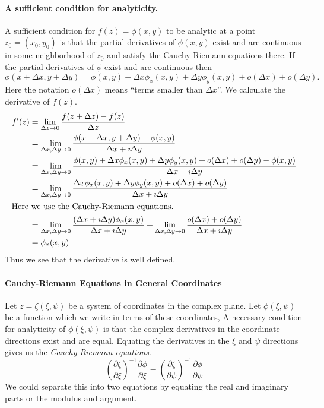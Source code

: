 \paragraph{A sufficient condition for analyticity.}
A sufficient condition for $f(z) = \phi(x,y)$ to be analytic at a point
$z_0 = \left( x_0,y_0 \right)$  is that the partial derivatives 
of $\phi(x,y)$ exist and 
are continuous in some neighborhood of $z_0$ and satisfy the 
Cauchy-Riemann equations there.
If the partial derivatives of $\phi$ exist and are continuous then
\[
\phi(x+\Delta x, y+\Delta y) = \phi(x,y) + \Delta x \phi_x(x,y) + \Delta y \phi_y(x,y)
+ o(\Delta x) + o(\Delta y).
\]
Here the notation $o(\Delta x)$ means ``terms smaller than $\Delta x$''.
We calculate the derivative of $f(z)$.
\begin{align*}
  f'(z)   &= \lim_{\Delta z \to 0} \frac{f(z+\Delta z)-f(z)}{\Delta z} \\
  &= \lim_{\Delta x, \Delta y \to 0} \frac{ \phi(x+\Delta x,y+\Delta y) - \phi(x,y) }
  {\Delta x + \imath \Delta y} 
  \\
  &= \lim_{\Delta x, \Delta y \to 0} \frac{ \phi(x,y) + \Delta x \phi_x(x,y) + 
    \Delta y \phi_y(x,y) + o(\Delta x) + o(\Delta y) 
    - \phi(x,y) }{ \Delta x + \imath \Delta y } 
  \\
  &= \lim_{\Delta x, \Delta y \to 0} \frac{ \Delta x \phi_x(x,y) + 
    \Delta y \phi_y(x,y) + o(\Delta x) + o(\Delta y) }
  {\Delta x + \imath \Delta y}
  \\
  \intertext{Here we use the Cauchy-Riemann equations.}
  &= \lim_{\Delta x, \Delta y \to 0} \frac{ (\Delta x + \imath \Delta y) \phi_x(x,y) }{\Delta x + \imath \Delta y} 
  + \lim_{\Delta x, \Delta y \to 0} \frac{ o(\Delta x) + o(\Delta y) } {\Delta x + \imath \Delta y}
  \\
  &= \phi_x(x,y)
\end{align*}
Thus we see that the derivative is well defined.









\paragraph{Cauchy-Riemann Equations in General Coordinates}
Let $z = \zeta(\xi, \psi)$ be a system of coordinates in the complex plane.  
Let $\phi(\xi, \psi)$ be a function which we write in terms of these 
coordinates, A necessary condition for analyticity of $\phi(\xi, \psi)$ is that
the complex derivatives in the coordinate directions exist and are equal.
Equating the derivatives in the $\xi$ and $\psi$ directions gives us the 
\textit{Cauchy-Riemann equations}.
\[
\left( \frac{\partial \zeta}{\partial \xi} \right)^{-1} \frac{\partial \phi}{\partial \xi}
= \left( \frac{\partial \zeta}{\partial \psi} \right)^{-1} \frac{\partial \phi}{\partial \psi}
\]
We could separate this into two equations by equating the real and 
imaginary parts or the modulus and argument.





